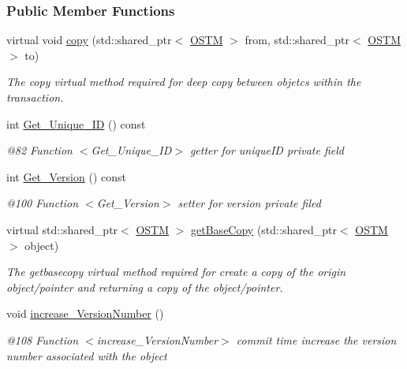 \subsubsection*{Public Member Functions}
\begin{DoxyCompactItemize}
\item 
virtual void \hyperlink{class_o_s_t_m_a535d90fced5adbb70312c92f3778e08d_a535d90fced5adbb70312c92f3778e08d}{copy} (std\+::shared\+\_\+ptr$<$ \hyperlink{class_o_s_t_m}{O\+S\+TM} $>$ from, std\+::shared\+\_\+ptr$<$ \hyperlink{class_o_s_t_m}{O\+S\+TM} $>$ to)
\begin{DoxyCompactList}\small\item\em The copy virtual method required for deep copy between objetcs within the transaction. \end{DoxyCompactList}\item 
int \hyperlink{class_o_s_t_m_a5a01a8b98d16b1d1904ecf9356e7b71d_a5a01a8b98d16b1d1904ecf9356e7b71d}{Get\+\_\+\+Unique\+\_\+\+ID} () const 
\begin{DoxyCompactList}\small\item\em @82 Function $<$\+Get\+\_\+\+Unique\+\_\+\+I\+D$>$ getter for unique\+ID private field \end{DoxyCompactList}\item 
int \hyperlink{class_o_s_t_m_a1f1db9d482f22c8e7caa17dfb340626b_a1f1db9d482f22c8e7caa17dfb340626b}{Get\+\_\+\+Version} () const 
\begin{DoxyCompactList}\small\item\em @100 Function $<$\+Get\+\_\+\+Version$>$ setter for version private filed \end{DoxyCompactList}\item 
virtual std\+::shared\+\_\+ptr$<$ \hyperlink{class_o_s_t_m}{O\+S\+TM} $>$ \hyperlink{class_o_s_t_m_a0bfa3763bd441407dd6365f42714f94c_a0bfa3763bd441407dd6365f42714f94c}{get\+Base\+Copy} (std\+::shared\+\_\+ptr$<$ \hyperlink{class_o_s_t_m}{O\+S\+TM} $>$ object)
\begin{DoxyCompactList}\small\item\em The getbasecopy virtual method required for create a copy of the origin object/pointer and returning a copy of the object/pointer. \end{DoxyCompactList}\item 
void \hyperlink{class_o_s_t_m_a5f90caa4384d371c16b7cac860d9f89a_a5f90caa4384d371c16b7cac860d9f89a}{increase\+\_\+\+Version\+Number} ()
\begin{DoxyCompactList}\small\item\em @108 Function $<$increase\+\_\+\+Version\+Number$>$ commit time increase the version number associated with the object \end{DoxyCompactList}\item 

\end{DoxyCompactItemize}
